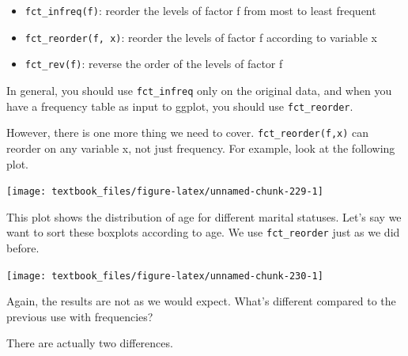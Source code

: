 \documentclass[]{tufte-book}
\newenvironment{Shaded}{}{}
\newcommand{\KeywordTok}[1]{\textcolor[rgb]{0.00,0.44,0.13}{\textbf{#1}}}
\newcommand{\NormalTok}[1]{#1}
\newcommand{\OperatorTok}[1]{\textcolor[rgb]{0.40,0.40,0.40}{#1}}
\newcommand{\StringTok}[1]{\textcolor[rgb]{0.25,0.44,0.63}{#1}}
\providecommand{\tightlist}{%
  \setlength{\itemsep}{0pt}\setlength{\parskip}{0pt}}
\begin{document}
\begin{itemize}
\tightlist
\item
  \texttt{fct\_infreq(f)}: reorder the levels of factor f from most to least frequent
\item
  \texttt{fct\_reorder(f,\ x)}: reorder the levels of factor f according to variable x
\item
  \texttt{fct\_rev(f)}: reverse the order of the levels of factor f
\end{itemize}

In general, you should use \texttt{fct\_infreq} only on the original data, and when you have a frequency table as input to ggplot, you should use \texttt{fct\_reorder}.

However, there is one more thing we need to cover. \texttt{fct\_reorder(f,x)} can reorder on any variable x, not just frequency. For example, look at the following plot.

\begin{Shaded}
\end{Shaded}

\texttt{[image: textbook\_files/figure-latex/unnamed-chunk-229-1]}

This plot shows the distribution of age for different marital statuses. Let's say we want to sort these boxplots according to age. We use \texttt{fct\_reorder} just as we did before.

\begin{Shaded}
\end{Shaded}

\texttt{[image: textbook\_files/figure-latex/unnamed-chunk-230-1]}

Again, the results are not as we would expect. What's different compared to the previous use with frequencies?

There are actually two differences.
\end{document}
